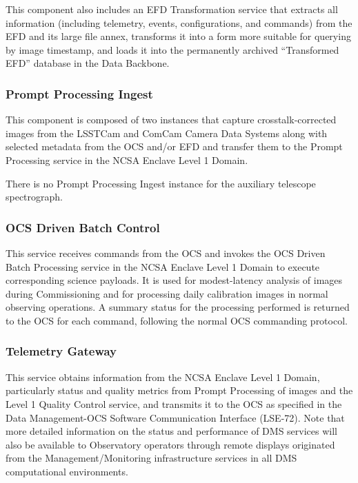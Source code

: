 \documentclass[DM,lsstdraft,toc]{lsstdoc}
\begin{document}
This component also includes an EFD Transformation service that extracts
all information (including telemetry, events, configurations, and
commands) from the EFD and its large file annex, transforms it into a
form more suitable for querying by image timestamp, and loads it into
the permanently archived ``Transformed EFD'' database in the Data
Backbone.

\subsubsection{Prompt Processing Ingest}\label{prompt-processing-ingest}

This component is composed of two instances that capture
crosstalk-corrected images from the LSSTCam and ComCam Camera Data
Systems along with selected metadata from the OCS and/or EFD and
transfer them to the Prompt Processing service in the NCSA Enclave Level
1 Domain.

There is no Prompt Processing Ingest instance for the auxiliary
telescope spectrograph.

\subsubsection{OCS Driven Batch Control}\label{ocs-driven-batch-control}

This service receives commands from the OCS and invokes the OCS Driven
Batch Processing service in the NCSA Enclave Level 1 Domain to execute
corresponding science payloads. It is used for modest-latency analysis
of images during Commissioning and for processing daily calibration
images in normal observing operations. A summary status for the
processing performed is returned to the OCS for each command, following
the normal OCS commanding protocol.

\subsubsection{Telemetry Gateway}\label{telemetry-gateway}

This service obtains information from the NCSA Enclave Level 1 Domain,
particularly status and quality metrics from Prompt Processing of images
and the Level 1 Quality Control service, and transmits it to the OCS as
specified in the Data Management-OCS Software Communication Interface
(LSE-72). Note that more detailed information on the status and
performance of DMS services will also be available to Observatory
operators through remote displays originated from the
Management/Monitoring infrastructure services in all DMS computational
environments.
\end{document}
